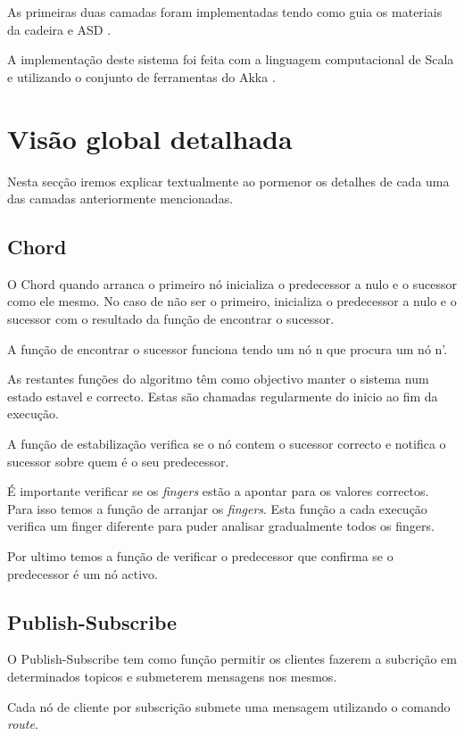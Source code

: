 \documentclass[12pt]{article}
\begin{document}
As primeiras duas camadas foram implementadas tendo como guia os materiais da cadeira e ASD \cite{b1}.

A implementação deste sistema foi feita com a linguagem computacional de Scala \cite{b3} e utilizando o conjunto de ferramentas do Akka \cite{b4}. 

\newpage
\section{Visão global detalhada}

Nesta secção iremos explicar textualmente ao pormenor os detalhes de cada uma das camadas anteriormente mencionadas.

\newpage
\subsection{Chord}

O Chord quando arranca o primeiro nó inicializa o predecessor a nulo e o sucessor como ele mesmo. No caso de não ser o primeiro, inicializa o predecessor a nulo e o sucessor com o resultado da função de encontrar o sucessor.

A função de encontrar o sucessor funciona tendo um nó n que procura um nó n'.

As restantes funções do algoritmo têm como objectivo manter o sistema num estado estavel e correcto. Estas são chamadas regularmente do inicio ao fim da execução.

A função de estabilização verifica se o nó contem o sucessor correcto e notifica o sucessor sobre quem é o seu predecessor.

É importante verificar se os \emph{fingers} estão a apontar para os valores correctos. Para isso temos a função de arranjar os \emph{fingers}. Esta função a cada execução verifica um finger diferente para puder analisar gradualmente todos os fingers.

Por ultimo temos a função de verificar o predecessor que confirma se o predecessor é um nó activo.

\newpage
\subsection{Publish-Subscribe}

O Publish-Subscribe tem como função permitir os clientes fazerem a subcrição em determinados topicos e submeterem mensagens nos mesmos.

Cada nó de cliente por subscrição submete uma mensagem utilizando o comando \emph{route}.
\end{document}
